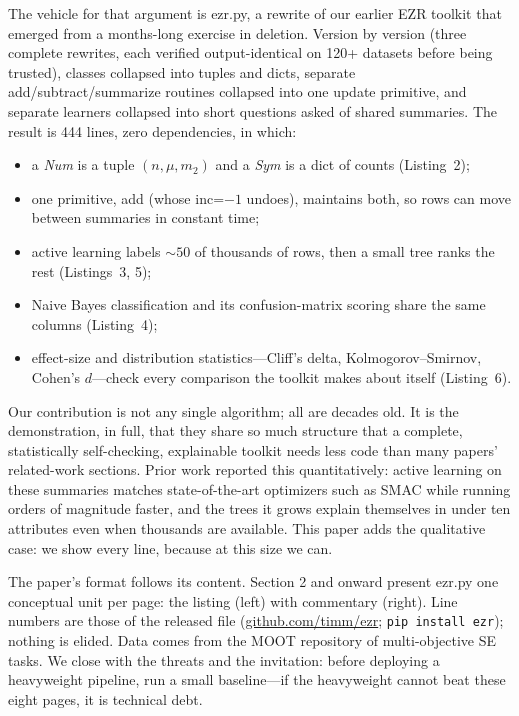 \documentclass[acmsmall,nonacm]{acmart}
\begin{document}
The vehicle for that argument is ezr.py, a rewrite of our
earlier EZR toolkit that emerged from a months-long exercise
in deletion. Version by version (three complete rewrites,
each verified output-identical on 120+ datasets before being
trusted), classes collapsed into tuples and dicts, separate
add/subtract/summarize routines collapsed into one update
primitive, and separate learners collapsed into short
questions asked of shared summaries. The result is 444
lines, zero dependencies, in which:
\begin{itemize}
\item a \emph{Num} is a tuple $(n, \mu, m_2)$ and a
  \emph{Sym} is a dict of counts (Listing~2);
\item one primitive, add (whose inc=$-1$ undoes), maintains
  both, so rows can move between summaries in constant time;
\item active learning labels ${\sim}50$ of thousands of
  rows, then a small tree ranks the rest (Listings~3, 5);
\item Naive Bayes classification and its confusion-matrix
  scoring share the same columns (Listing~4);
\item effect-size and distribution statistics---Cliff's
  delta, Kolmogorov--Smirnov, Cohen's $d$---check every
  comparison the toolkit makes about itself (Listing~6).
\end{itemize}

Our contribution is not any single algorithm; all are
decades old. It is the demonstration, in full, that they
share so much structure that a complete, statistically
self-checking, explainable toolkit needs less code than
many papers' related-work sections. Prior work reported
this quantitatively: active learning on these summaries
matches state-of-the-art optimizers such as SMAC while
running orders of magnitude faster, and the trees it grows
explain themselves in under ten attributes even when
thousands are available. This paper adds the qualitative
case: we show every line, because at this size we can.

The paper's format follows its content. Section 2 and
onward present ezr.py one conceptual unit per page: the
listing (left) with commentary (right). Line numbers are
those of the released file (\url{github.com/timm/ezr};
\texttt{pip install ezr}); nothing is elided. Data comes from the MOOT
repository of multi-objective SE tasks. We close with the
threats and the invitation: before deploying a heavyweight
pipeline, run a small baseline---if the heavyweight cannot
beat these eight pages, it is technical debt.
\end{document}
